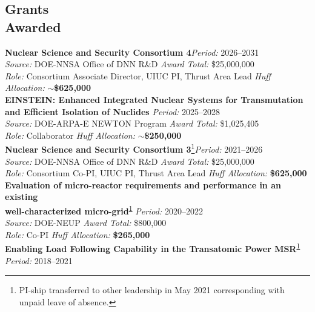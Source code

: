 \documentclass[margin,line]{resume}
\begin{document}
\begin{resume}
    \section{\mysidestyle Grants\\Awarded}
    \textbf{Nuclear Science and Security Consortium 4}\hfill\textsl{Period:} 2026--2031\\
    \textsl{Source:} DOE-NNSA Office of DNN R\&D \hfill \textsl{Award Total:} \$25,000,000\\
    \textsl{Role:} Consortium Associate Director, UIUC PI, Thrust Area Lead \hfill \textsl{Huff Allocation:} \textbf{$\sim$\$625,000}\vspace{2mm}\\%
    \textbf{EINSTEIN: Enhanced Integrated Nuclear Systems for Transmutation and 
    Efficient Isolation of Nuclides} \hfill \textsl{Period:} 2025--2028\\
    \textsl{Source:} DOE-ARPA-E NEWTON Program \hfill \textsl{Award Total:} \$1,025,405\\
    \textsl{Role:} Collaborator \hfill \textsl{Huff Allocation:} \textbf{$\sim$\$250,000} \vspace{2mm}\\%
    \textbf{Nuclear Science and Security Consortium 3}\footnote{\label{footnote-label}PI-ship transferred to other leadership in May 2021 corresponding with unpaid leave of absence.}\hfill\textsl{Period:} 2021--2026\\
    \textsl{Source:} DOE-NNSA Office of DNN R\&D \hfill \textsl{Award Total:} \$25,000,000\\
    \textsl{Role:} Consortium Co-PI, UIUC PI, Thrust Area Lead \hfill \textsl{Huff Allocation:} \textbf{\$625,000}\vspace{2mm}\\%
    \textbf{Evaluation of micro-reactor requirements and performance in an 
    existing \\
    well-characterized micro-grid}\textsuperscript{\ref{footnote-label}} \hfill \textsl{Period:} 2020--2022\\
    \textsl{Source:} DOE-NEUP \hfill \textsl{Award Total:} \$800,000\\
    \textsl{Role:} Co-PI \hfill \textsl{Huff Allocation:} \textbf{\$265,000}\vspace{2mm}\\%
    \textbf{Enabling Load Following Capability in the Transatomic Power MSR}\textsuperscript{\ref{footnote-label}} \hfill \textsl{Period:}
    2018--2021\\

\end{resume}
\end{document}
